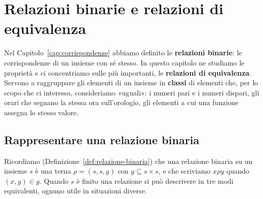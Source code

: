 \chapter{Relazioni binarie e relazioni di equivalenza}\label{cap:equivalenze}

Nel Capitolo~\ref{cap:corrispondenze} abbiamo definito le \textbf{relazioni binarie}: le corrispondenze di un insieme con
sé stesso. In questo capitolo ne studiamo le proprietà e ci concentriamo sulle più importanti, le \textbf{relazioni di
equivalenza}. Servono a raggruppare gli elementi di un insieme in \textbf{classi} di elementi che, per lo scopo che ci
interessa, consideriamo «uguali»: i numeri pari e i numeri dispari, gli orari che segnano la stessa ora sull'orologio,
gli elementi a cui una funzione assegna lo stesso valore.

\section{Rappresentare una relazione binaria}\label{sec:rappresentare-relazioni}

Ricordiamo (Definizione~\ref{def:relazione-binaria}) che una relazione binaria su un insieme $s$ è una terna
$\rho = (s, s, g)$ con $g \subseteq s \times s$, e che scriviamo $x \rho y$ quando $(x, y) \in g$. Quando $s$ è finito
una relazione si può descrivere in tre modi equivalenti, ognuno utile in situazioni diverse.

